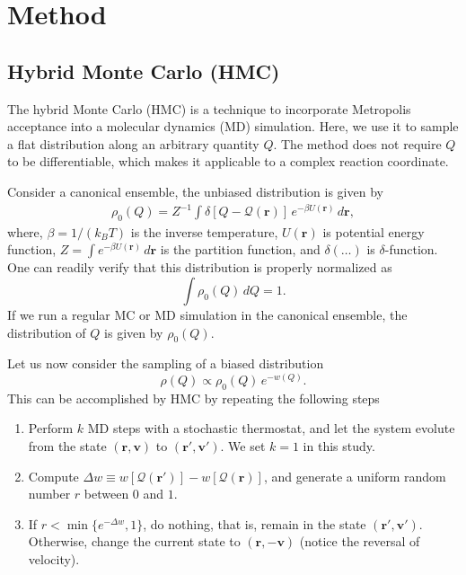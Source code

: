 \documentclass[notitlepage, preprint,superscriptaddress]{revtex4-1}
\newcommand{\vct}[1]{\mathbf{#1}}
\newcommand{\vv}{\vct{v}}
\newcommand{\Q}{\mathcal{Q}}
\begin{document}
\section{Method}

\subsection{Hybrid Monte Carlo (HMC)}



The hybrid Monte Carlo (HMC)
is a technique to incorporate Metropolis acceptance
into a molecular dynamics (MD) simulation.
%
Here, we use it to sample a flat distribution
along an arbitrary quantity $Q$.
%
The method
does not require $Q$ to be differentiable,
which makes it applicable to
a complex reaction coordinate.

Consider a canonical ensemble,
the unbiased distribution
is given by
\begin{align}
  \rho_0(Q)
=
  Z^{-1} \int \delta[Q - \Q(\vct{r})] \, e^{-\beta U(\vct{r})} \, d\vct{r},
\end{align}
where,
$\beta = 1/(k_B T)$ is the inverse temperature,
$U(\vct{r})$ is potential energy function,
$Z = \int e^{-\beta U(\vct{r})} \, d\vct{r}$ is the partition function,
and $\delta(\dots)$ is $\delta$-function.
%
One can readily verify that this distribution is properly normalized as
\[
  \int \rho_0(Q) \, dQ = 1.
\]
%
If we run a regular MC or MD simulation in the canonical ensemble,
the distribution of $Q$ is given by $\rho_0(Q)$.

Let us now consider the sampling of a biased distribution
\begin{equation}
  \rho(Q) \propto \rho_0(Q) \, e^{-w(Q)}.
\label{eq:rhoQbiased}
\end{equation}
This can be accomplished by HMC by repeating the following steps
\begin{enumerate}
  \item Perform $k$ MD steps with a stochastic thermostat,
        and let the system evolute
        from the state $(\vct{r}, \vv)$ to $(\vct{r}', \vv')$.
        We set $k = 1$ in this study.

  \item Compute $\Delta w \equiv w[\Q(\vct{r}')] - w[\Q(\vct{r})]$,
        and generate a uniform random number $r$ between $0$ and $1$.

  \item If $r < \min\{e^{-\Delta w}, 1\}$, do nothing,
        that is, remain in the state $(\vct{r}', \vv')$.
        Otherwise, change the current state to $(\vct{r}, -\vv)$
        (notice the reversal of velocity).
\end{enumerate}
\end{document}
